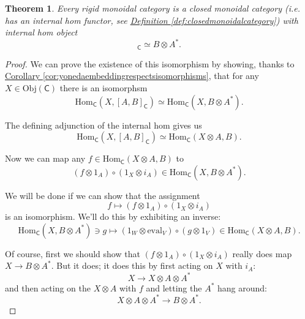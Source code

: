 \documentclass[a4paper]{report}
\newcommand{\Obj}{\mathrm{Obj}}
\newcommand{\Hom}{\mathrm{Hom}}
\newcommand{\ev}{\mathrm{eval}}
\theoremstyle{definition}
\theoremstyle{plain}
\newtheorem{theorem}{Theorem}[section]
\theoremstyle{remark}
\begin{document}
\begin{theorem}
  Every rigid monoidal category is a closed monoidal category (i.e. has an internal hom functor, see \hyperref[def:closedmonoidalcategory]{Definition \ref*{def:closedmonoidalcategory}}) with internal hom object 
  \begin{equation*}
    [A, B]_{\mathsf{C}} \simeq B \otimes A^{*}.
  \end{equation*}
\end{theorem}
\begin{proof}
  We can prove the existence of this isomorphism by showing, thanks to \hyperref[cor:yonedaembeddingrespectsisomorphisms]{Corollary \ref*{cor:yonedaembeddingrespectsisomorphisms}}, that for any $X \in \Obj(\mathsf{C})$ there is an isomorphsm
  \begin{equation*}
    \Hom_{\mathsf{C}}(X, [A, B]_{\mathsf{C}}) \simeq \Hom_{\mathsf{C}}(X, B \otimes A^{*}).
  \end{equation*}

  The defining adjunction of the internal hom gives us 
  \begin{equation*}
    \Hom_{\mathsf{C}}(X, [A, B]_{\mathsf{C}}) \simeq \Hom_{\mathsf{C}}(X \otimes A, B).
  \end{equation*}

  Now we can map any $f \in \Hom_{\mathsf{C}}(X \otimes A, B)$ to
  \begin{equation*}
    (f \otimes 1_{A}) \circ (1_{X} \otimes i_{A}) \in \Hom_{\mathsf{C}}(X, B \otimes A^{*}).
  \end{equation*}

  We will be done if we can show that the assignment
  \begin{equation*}
    f \mapsto (f \otimes 1_{A}) \circ (1_{X} \otimes i_{A})
  \end{equation*}
  is an isomorphism. We'll do this by exhibiting an inverse:
  \begin{equation*}
    \Hom_{\mathsf{C}}(X, B \otimes A^{*}) \ni g \mapsto (1_{W} \otimes \ev_{V}) \circ (g \otimes 1_{V}) \in \Hom_{\mathsf{C}}(X \otimes A, B).
  \end{equation*}

  Of course, first we should show that $(f \otimes 1_{A}) \circ (1_{X} \otimes i_{A})$ really does map $X \to B \otimes A^{*}$. But it does; it does this by first acting on $X$ with $i_{A}$:
  \begin{equation*}
    X \to X \otimes A \otimes A^{*}
  \end{equation*}
  and then acting on the $X \otimes A$ with $f$ and letting the $A^{*}$ hang around:
  \begin{equation*}
    X \otimes A \otimes A^{*} \to B \otimes A^{*}.
  \end{equation*}


\end{proof}
\end{document}
